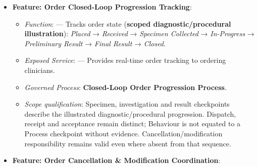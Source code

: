 \begin{itemize}
\begin{itemize}
\begin{itemize}
\item 
\emph{Function}: \texttt{} — Evaluates order routing rules to determine target laboratory, imaging centre, or procedural unit.



\item 
\emph{Exposed Service}: \texttt{} — Transmits orders to performing diagnostic systems.



\end{itemize}


\item 
\textbf{Feature: Order Closed-Loop Progression Tracking}:


\begin{itemize}

\item 
\emph{Function}: \texttt{} — Tracks order state (\textbf{scoped diagnostic/\allowbreak{}procedural illustration}): \emph{Placed} → \emph{Received} → \emph{Specimen Collected} → \emph{In-Progress} → \emph{Preliminary Result} → \emph{Final Result} → \emph{Closed}.



\item 
\emph{Exposed Service}: \texttt{} — Provides real-time order tracking to ordering clinicians.



\item 
\emph{Governed Process}: \textbf{Closed-Loop Order Progression Process}.



\item 
\emph{Scope qualification}: Specimen, investigation and result checkpoints describe the illustrated diagnostic/\allowbreak{}procedural progression. Dispatch, receipt and acceptance remain distinct; Behaviour \texttt{} is not equated to a Process checkpoint without evidence. Cancellation/\allowbreak{}modification responsibility remains valid even where absent from that sequence.



\end{itemize}


\item 
\textbf{Feature: Order Cancellation \& Modification Coordination}:


\begin{itemize}


\end{itemize}
\end{itemize}
\end{itemize}
